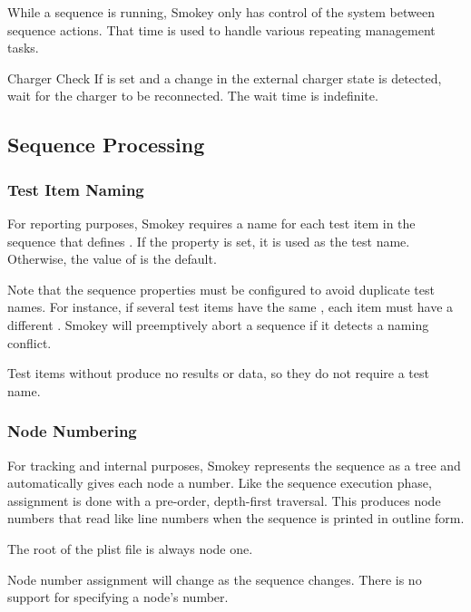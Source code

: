 While a sequence is running, Smokey only has control of the system between
sequence actions.  That time is used to handle various repeating management
tasks.

\begin{Definition}

\item[Charger Check] If  is set and a change in the
external charger state is detected, wait for the charger to be reconnected.
The wait time is indefinite.

\end{Definition}

\subsection{Sequence Processing}

\subsubsection{Test Item Naming}

For reporting purposes, Smokey requires a name for each test item in the
sequence that defines .  If the  property
is set, it is used as the test name.  Otherwise, the value of
 is the default.

Note that the sequence properties must be configured to avoid duplicate test
names.  For instance, if several test items have the same
, each item must have a different .
Smokey will preemptively abort a sequence if it detects a naming conflict.

Test items without  produce no results or data, so they
do not require a test name.

\subsubsection{Node Numbering}

For tracking and internal purposes, Smokey represents the sequence as a tree
and automatically gives each node a number.  Like the sequence execution phase,
assignment is done with a pre-order, depth-first traversal.  This produces node
numbers that read like line numbers when the sequence is printed in outline
form.

The root of the plist file is always node one.

Node number assignment will change as the sequence changes.  There is no
support for specifying a node's number.

